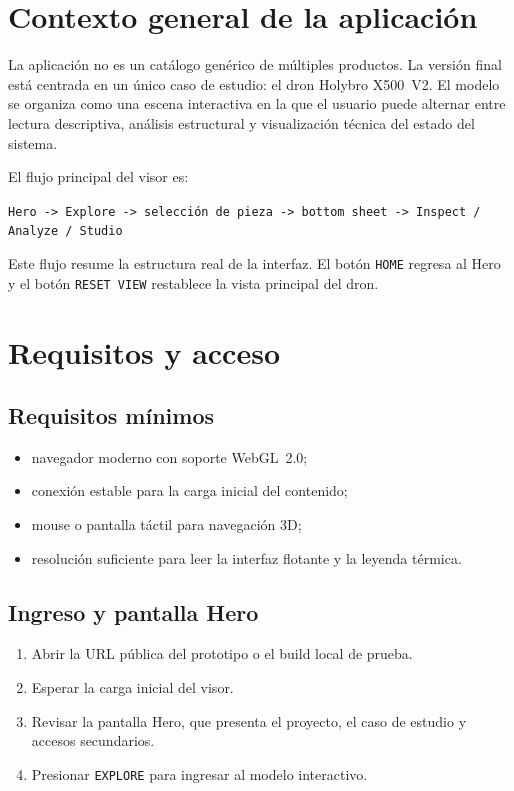 \documentclass[12pt,letterpaper]{article}
\begin{document}
\section{Contexto general de la aplicación}
La aplicación no es un catálogo genérico de múltiples productos. La versión final está centrada en un único caso de estudio: el dron Holybro X500~V2. El modelo se organiza como una escena interactiva en la que el usuario puede alternar entre lectura descriptiva, análisis estructural y visualización técnica del estado del sistema.

El flujo principal del visor es:

\begin{center}
\texttt{Hero -> Explore -> selección de pieza -> bottom sheet -> Inspect / Analyze / Studio}
\end{center}

\noindent Este flujo resume la estructura real de la interfaz. El botón \texttt{HOME} regresa al Hero y el botón \texttt{RESET VIEW} restablece la vista principal del dron.

\section{Requisitos y acceso}

\subsection{Requisitos mínimos}
\begin{itemize}
    \item navegador moderno con soporte WebGL~2.0;
    \item conexión estable para la carga inicial del contenido;
    \item mouse o pantalla táctil para navegación 3D;
    \item resolución suficiente para leer la interfaz flotante y la leyenda térmica.
\end{itemize}

\subsection{Ingreso y pantalla Hero}
\begin{enumerate}
    \item Abrir la URL pública del prototipo o el build local de prueba.
    \item Esperar la carga inicial del visor.
    \item Revisar la pantalla Hero, que presenta el proyecto, el caso de estudio y accesos secundarios.
    \item Presionar \texttt{EXPLORE} para ingresar al modelo interactivo.
\end{enumerate}
\end{document}
